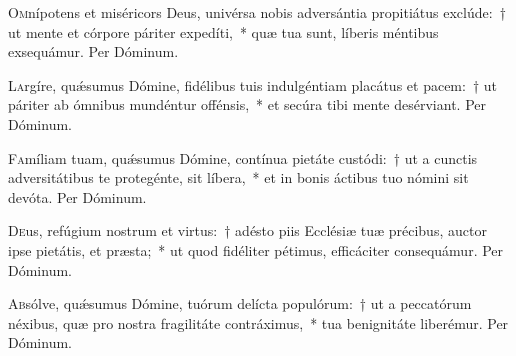 \documentclass[vesperale_romanum.tex]{subfiles}
\begin{document}

\oratio

\lettrine{O}{m}nípotens et miséricors Deus, univérsa nobis adversántia propitiátus exclúde:~† ut mente et córpore páriter expedíti,~* quæ tua sunt, líberis méntibus exsequámur. Per Dóminum.



\oratio

\lettrine{L}{a}rgíre, quǽsumus Dómine, fidélibus tuis indulgéntiam placátus et pacem:~† ut páriter ab ómnibus mundéntur offénsis,~* et secúra tibi mente desérviant. Per Dóminum.



\oratio

\lettrine{F}{a}míliam tuam, quǽsumus Dómine, contínua pietáte custódi:~† ut a cunctis adversitátibus te protegénte, sit líbera,~* et in bonis áctibus tuo nómini sit devóta. Per Dóminum.



\oratio

\lettrine{D}{e}us, refúgium nostrum et virtus:~† adésto piis Ecclésiæ tuæ précibus, auctor ipse pietátis, et præsta;~* ut quod fidéliter pétimus, efficáciter consequámur. Per Dóminum.




\oratio

\lettrine{A}{b}sólve, quǽsumus Dómine, tuórum delícta populórum:~† ut a peccatórum néxibus, quæ pro nostra fragilitáte contráximus,~* tua benignitáte liberémur. Per Dóminum.

\end{document}
